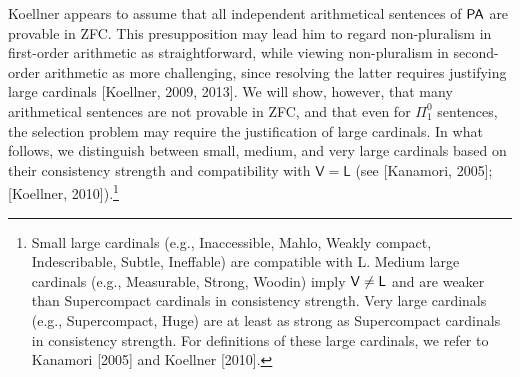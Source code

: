 \documentclass[a4paper,12pt]{amsart}
\theoremstyle{definition}
\numberwithin{equation}{section}
\begin{document}
Koellner appears to assume that all independent arithmetical sentences of ${\sf PA}$ are provable in {\sf ZFC}. This presupposition may lead him to regard non-pluralism in first-order arithmetic as straightforward, while viewing non-pluralism in second-order arithmetic as more challenging, since resolving the latter requires justifying large cardinals [Koellner, 2009, 2013]. We will show, however, that many arithmetical sentences are not provable in {\sf ZFC}, and that even for $\Pi^0_1$ sentences, the selection problem may require the justification of large cardinals. In what follows, we distinguish between small, medium, and very large cardinals based on their consistency strength and compatibility with $\mathsf{V} = \mathsf{L}$ (see [Kanamori, 2005]; [Koellner, 2010]).\footnote{Small large cardinals (e.g., Inaccessible, Mahlo, Weakly compact, Indescribable, Subtle, Ineffable) are compatible with {\sf L}. Medium large cardinals (e.g., Measurable, Strong, Woodin) imply $\sf V\neq L$ and are weaker than Supercompact cardinals in consistency strength. Very large cardinals (e.g., Supercompact, Huge) are at least as strong as Supercompact cardinals in consistency strength. For  definitions of these large cardinals, we refer to Kanamori [2005] and Koellner [2010].}
\end{document}
